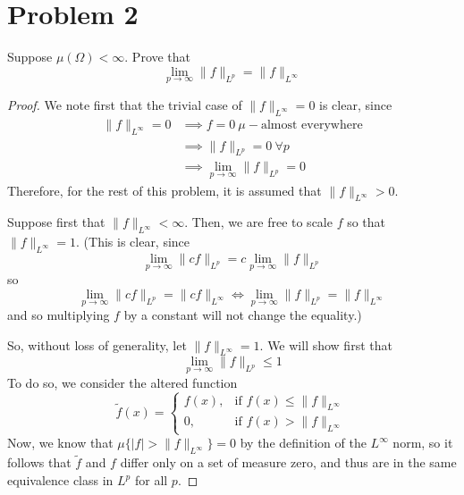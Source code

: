\documentclass[fontsize=11pt]{scrartcl} %
\numberwithin{equation}{section} %
\numberwithin{figure}{section} %
\numberwithin{table}{section} %
\begin{document}
\newpage

\section*{Problem 2}
Suppose $\mu(\Omega)<\infty$. Prove that
\[
    \lim_{p\to\infty} \|f\|_{L^p} = \|f\|_{L^{\infty}}
\]

\begin{proof}
    We note first that the trivial case of $\|f\|_{L^{\infty}} = 0$ is clear,
    since 
    \[
        \begin {aligned}
        \|f\|_{L^{\infty}}=0 &\implies f = 0\ \mu-\textrm{almost everywhere}\\
                            &\implies \|f\|_{L^p}=0\ \forall p\\
                            &\implies \lim_{p\to\infty}\|f\|_{L^p} = 0
\end{aligned}
    \]
    Therefore, for the rest of this problem, it is assumed that
    $\|f\|_{L^{\infty}}>0$.


    Suppose first that $\|f\|_{L^{\infty}} < \infty$. Then, we are free to scale
    $f$ so that $\|f\|_{L^{\infty}}=1$. (This is clear, since
    \[
        \lim_{p\to\infty}\|cf\|_{L^p} = c\lim_{p\to\infty}\|f\|_{L^p}
    \]
    so
    \[
        \lim_{p\to\infty}\|cf\|_{L^p} = \|cf\|_{L^{\infty}}
        \iff
        \lim_{p\to\infty}\|f\|_{L^p} = \|f\|_{L^{\infty}}
    \]
    and so multiplying $f$ by a constant will not change the equality.)

    So, without loss of generality, let $\|f\|_{L^{\infty}} = 1$.
    We will show first that
    \[
        \lim_{p\to\infty}\|f\|_{L^p} \leq 1
    \]
    To do so, we consider the altered function
    \[
        \tilde{f}(x) = \begin{cases}
            f(x), &\textrm{if } f(x) \leq \|f\|_{L^\infty}\\
            0, &\textrm{if } f(x) > \|f\|_{L^\infty}
        \end{cases}
    \]
    Now, we know that $\mu\{|f| > \|f\|_{L^{\infty}}\} = 0$ by the definition of
    the $L^{\infty}$ norm, so it follows that $\tilde{f}$ and $f$ differ only on
    a set of measure zero, and thus are in the same equivalence class in $L^p$
    for all $p$.


\end{proof}
\end{document}
